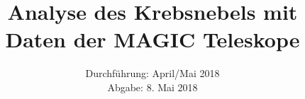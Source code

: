 

\subject{Lehrstuhlversuch E5b}
\title{Analyse des Krebsnebels mit Daten der MAGIC Teleskope}
\date{Durchführung: April/Mai 2018 \\
      Abgabe: 8. Mai 2018}



\maketitle
\newpage






\printbibliography


